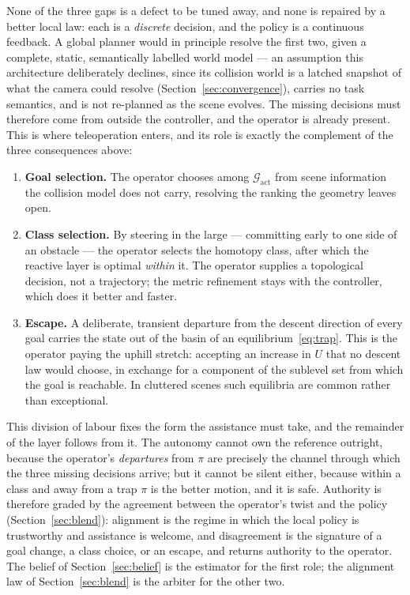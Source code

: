 \documentclass[12pt,a4paper,twoside,openright]{report}
\begin{document}
None of the three gaps is a defect to be tuned away, and none is repaired by a better local law: each is a \emph{discrete} decision, and the policy is a continuous feedback. A global planner would in principle resolve the first two, given a complete, static, semantically labelled world model --- an assumption this architecture deliberately declines, since its collision world is a latched snapshot of what the camera could resolve (Section~\ref{sec:convergence}), carries no task semantics, and is not re-planned as the scene evolves. The missing decisions must therefore come from outside the controller, and the operator is already present. This is where teleoperation enters, and its role is exactly the complement of the three consequences above:
\begin{enumerate}[nosep]
\item \textbf{Goal selection.} The operator chooses among $\mathcal{G}_{\text{act}}$ from scene information the collision model does not carry, resolving the ranking the geometry leaves open.
\item \textbf{Class selection.} By steering in the large --- committing early to one side of an obstacle --- the operator selects the homotopy class, after which the reactive layer is optimal \emph{within} it. The operator supplies a topological decision, not a trajectory; the metric refinement stays with the controller, which does it better and faster.
\item \textbf{Escape.} A deliberate, transient departure from the descent direction of every goal carries the state out of the basin of an equilibrium~\eqref{eq:trap}. This is the operator paying the uphill stretch: accepting an increase in $U$ that no descent law would choose, in exchange for a component of the sublevel set from which the goal is reachable. In cluttered scenes such equilibria are common rather than exceptional.
\end{enumerate}
This division of labour fixes the form the assistance must take, and the remainder of the layer follows from it. The autonomy cannot own the reference outright, because the operator's \emph{departures} from $\pi$ are precisely the channel through which the three missing decisions arrive; but it cannot be silent either, because within a class and away from a trap $\pi$ is the better motion, and it is safe. Authority is therefore graded by the agreement between the operator's twist and the policy (Section~\ref{sec:blend}): alignment is the regime in which the local policy is trustworthy and assistance is welcome, and disagreement is the signature of a goal change, a class choice, or an escape, and returns authority to the operator. The belief of Section~\ref{sec:belief} is the estimator for the first role; the alignment law of Section~\ref{sec:blend} is the arbiter for the other two.
\end{document}
